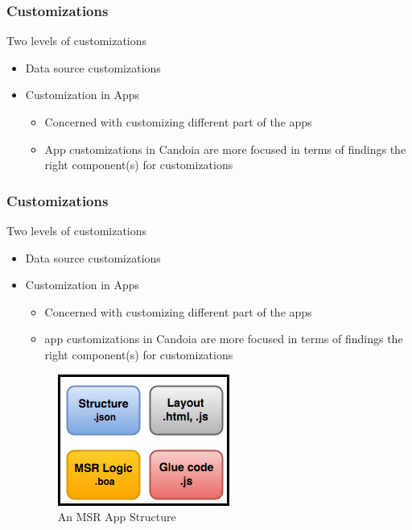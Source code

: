        \begin{frame}
        \frametitle{Customizations}
            Two levels of customizations
            \begin{itemize}
                \item Data source customizations
                \item Customization in Apps
                    \begin{itemize}
                        \item Concerned with customizing different part of the apps
                        \item App customizations in Candoia are more focused in terms of findings the right component(s) for customizations
                    \end{itemize}
            \end{itemize}
        \end{frame}

        \begin{frame}
        \frametitle{Customizations}
            Two levels of customizations
            \begin{itemize}
                \item Data source customizations
                \item Customization in Apps
                    \begin{itemize}
                        \item Concerned with customizing different part of the apps
                        \item app customizations in Candoia are more focused in terms of findings the right component(s) for customizations
                        \end{itemize}
            \begin{figure}
                \centering
                \includegraphics[scale=0.40]{figures/app.jpg}
                \caption{An MSR App Structure}
            \end{figure}
            \end{itemize}
        \end{frame}



